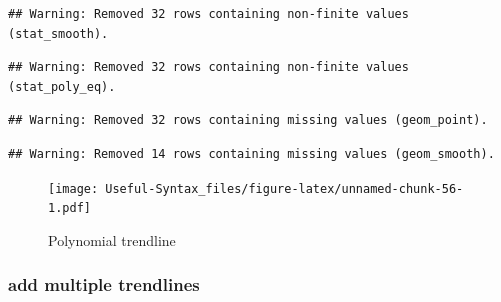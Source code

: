 \documentclass[
]{article}
\begin{document}
\begin{verbatim}
## Warning: Removed 32 rows containing non-finite values (stat_smooth).
\end{verbatim}

\begin{verbatim}
## Warning: Removed 32 rows containing non-finite values (stat_poly_eq).
\end{verbatim}

\begin{verbatim}
## Warning: Removed 32 rows containing missing values (geom_point).
\end{verbatim}

\begin{verbatim}
## Warning: Removed 14 rows containing missing values (geom_smooth).
\end{verbatim}

\begin{figure}
\centering
\texttt{[image: Useful-Syntax\_files/figure-latex/unnamed-chunk-56-1.pdf]}
\caption{\label{fig:unnamed-chunk-56}Polynomial trendline}
\end{figure}

\hypertarget{add-multiple-trendlines}{%
\subsubsection{add multiple trendlines}\label{add-multiple-trendlines}}
\end{document}

